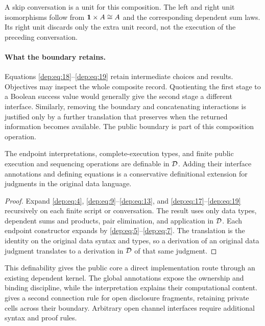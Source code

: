 A skip conversation is a unit for this composition. The left and
right unit isomorphisms follow from $\mathbf 1\times A\cong A$ and the
corresponding dependent sum laws. Its right unit discards only the extra unit
record, not the execution of the preceding conversation.

\paragraph{What the boundary retains.}
Equations \eqref{dep:eq:18}--\eqref{dep:eq:19} retain intermediate choices and results. Objectives may
inspect the whole composite record. Quotienting the first stage to a Boolean
success value would generally give the second stage a different interface.
Similarly, removing the boundary and concatenating interactions is justified
only by a further translation that preserves when the returned information
becomes available. The public boundary is part of this composition operation.

\begin{proposition}
\label{prop:definability}
The endpoint interpretations, complete-execution types, and finite public
execution and sequencing operations are definable in $\mathcal D$. Adding their
interface annotations and defining equations is a conservative definitional
extension for judgments in the original data language.
\end{proposition}
\begin{proof}
Expand \eqref{dep:eq:4}, \eqref{dep:eq:9}--\eqref{dep:eq:13}, and \eqref{dep:eq:17}--\eqref{dep:eq:19} recursively on each finite script or
conversation. The result uses only data types, dependent sums and products,
pair elimination, and application in $\mathcal D$. Each endpoint constructor expands
by \eqref{dep:eq:5}--\eqref{dep:eq:7}. The translation is the identity on the original data syntax and
types, so a derivation of an original data judgment translates to a derivation
in $\mathcal D$ of that same judgment.
\end{proof}

This definability gives the public core a direct implementation route through
an existing dependent kernel. The global annotations expose the ownership and
binding discipline, while the interpretation explains their computational
content.  gives a second connection rule for
open disclosure fragments, retaining private cells across their boundary.
Arbitrary open channel interfaces require additional syntax and proof rules.
